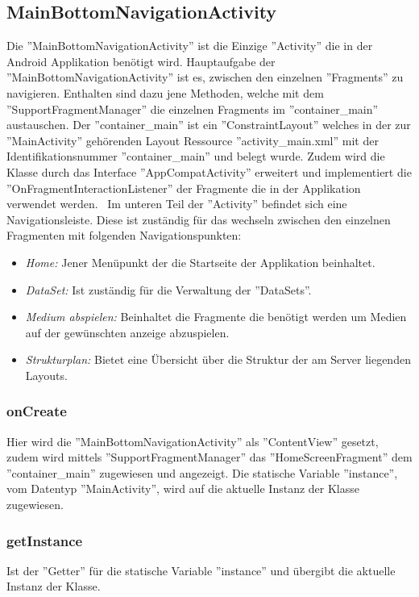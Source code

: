 \subsection{MainBottomNavigationActivity}
Die ''MainBottomNavigationActivity'' ist die Einzige ''Activity'' die in der Android Applikation benötigt wird. Hauptaufgabe der ''MainBottomNavigationActivity'' ist es, zwischen den einzelnen ''Fragments'' zu navigieren. Enthalten sind dazu jene Methoden, welche mit dem ''SupportFragmentManager'' die einzelnen Fragments im ''container\_main'' austauschen. Der ''container\_main'' ist ein ''ConstraintLayout'' welches in der zur ''MainActivity'' gehörenden Layout Ressource ''activity\_main.xml'' mit der Identifikationsnummer ''container\_main'' und  belegt wurde. Zudem wird die Klasse durch das Interface ''AppCompatActivity'' erweitert und implementiert die ''OnFragmentInteractionListener'' der Fragmente die in der Applikation verwendet werden. 
\
Im unteren Teil der ''Activity'' befindet sich eine Navigationsleiste. Diese ist zuständig für das wechseln zwischen den einzelnen Fragmenten mit folgenden Navigationspunkten: 

\begin{itemize}
	\item {\em Home:} Jener Menüpunkt der die Startseite der Applikation beinhaltet.
	\item {\em DataSet:} Ist zuständig für die Verwaltung der ''DataSets''.
	\item{\em Medium abspielen:} Beinhaltet die Fragmente die benötigt werden um Medien auf der gewünschten anzeige abzuspielen.
	\item {\em Strukturplan:} Bietet eine Übersicht über die Struktur der am Server liegenden Layouts.
\end{itemize}
\subsubsection{onCreate}
Hier wird die ''MainBottomNavigationActivity'' als ''ContentView'' gesetzt, zudem wird mittels ''SupportFragmentManager'' das ''HomeScreenFragment'' dem ''container\_main'' zugewiesen und angezeigt. Die statische Variable ''instance'', vom Datentyp ''MainActivity'', wird auf die aktuelle Instanz der Klasse zugewiesen. 	
\subsubsection{getInstance}
 Ist der ''Getter'' für die statische Variable ''instance'' und übergibt die aktuelle Instanz der Klasse.
